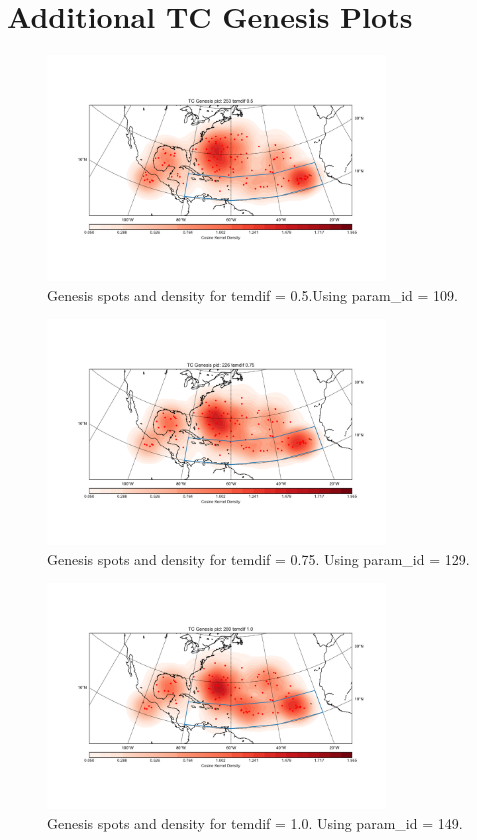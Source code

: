 \chapter{Additional TC Genesis Plots}\label{sec:genesis-appendix}

\begin{figure}[ht]
	\centering
	\includegraphics[width=0.8\textwidth]{img/genesis_plot_temdif05.pdf}
	\caption{Genesis spots and density for temdif = 0.5.Using param\_id = 109.}
\end{figure}
\begin{figure}[ht]
	\centering
	\includegraphics[width=0.8\textwidth]{img/genesis_plot_temdif075.pdf}
	\caption{Genesis spots and density for temdif = 0.75. Using param\_id = 129.}
\end{figure}
\begin{figure}[ht]
	\centering
	\includegraphics[width=0.8\textwidth]{img/genesis_plot_temdif1.pdf}
	\caption{Genesis spots and density for temdif = 1.0. Using param\_id = 149.}
\end{figure}
